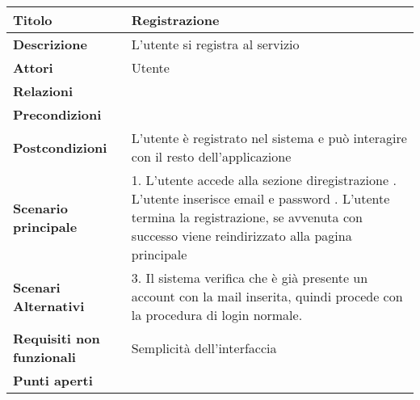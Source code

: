 \begin{tabular} {|P{4.5cm}|P{12.5cm}|}
  \hline
  \textbf{Titolo}                   & Registrazione                                                                            \\
  \hline
  \textbf{Descrizione}              & L'utente si registra al servizio                                                         \\
  \hline
  \textbf{Attori}                   & Utente                                                                                   \\
  \hline
  \textbf{Relazioni}                &                                                                                          \\
  \hline
  \textbf{Precondizioni}            &                                                                                          \\
  \hline
  \textbf{Postcondizioni}           & L'utente è registrato nel sistema e può interagire con il resto dell'applicazione        \\
  \hline
  \textbf{Scenario principale}      &
  1. L'utente accede alla sezione diregistrazione . L'utente inserisce email e  password . L'utente termina la registrazione, se avvenuta con successo viene reindirizzato alla pagina principale                    \\
  \hline
  \textbf{Scenari Alternativi}      &
  3. Il sistema verifica che è già presente un account con la mail inserita, quindi procede con la procedura di login normale. \\
  \hline
  \textbf{Requisiti non funzionali} & Semplicità dell'interfaccia                                                              \\
  \hline
  \textbf{Punti aperti}             &                                                                                          \\
  \hline
\end{tabular}
\hfill
\break

